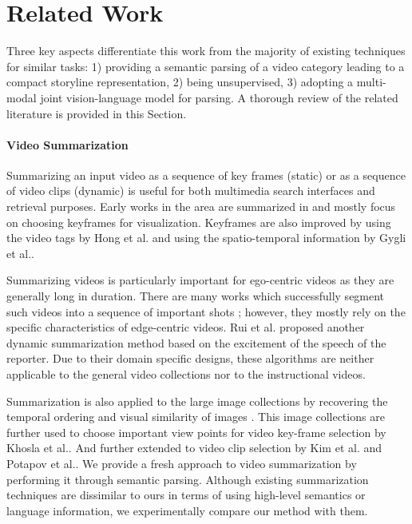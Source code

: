 \section{Related Work}
Three key aspects differentiate this work from the majority of existing techniques for similar tasks: 1) providing a semantic parsing of a video category leading to a compact storyline representation, 2) being unsupervised, 3) adopting a multi-modal joint vision-language model for parsing. A thorough review of the related literature is provided in this Section.

\paragraph{Video Summarization}
Summarizing an input video as a sequence of key frames (static) or as a sequence of video clips (dynamic) is useful for both multimedia search interfaces and retrieval purposes. Early works in the area are summarized in \cite{vidAbstraction} and mostly focus on choosing keyframes for visualization. Keyframes are also improved by using the video tags by Hong et al.\cite{beyondSearch} and using the spatio-temporal information by Gygli et al.\cite{createSum}.

Summarizing videos is particularly important for ego-centric videos as they are generally long in duration. There are many works which successfully segment such videos into a sequence of important shots \cite{lee2012discovering, lu2013story}; however, they mostly rely on the specific characteristics of edge-centric videos. Rui et al. \cite{rui2000automatically} proposed another dynamic summarization method based on the excitement of the speech of the reporter. Due to their domain specific designs, these algorithms are neither applicable to the general video collections nor to the instructional videos.

Summarization is also applied to the large image collections by recovering the temporal ordering and visual similarity of images \cite{storyGraph}. This image collections are further used to choose important view points for video key-frame selection by Khosla et al.\cite{khosla2013large}. And further extended to video clip selection by Kim et al.\cite{kim2014joint} and Potapov et al.\cite{potapov2014category}. We provide a fresh approach to video summarization by performing it through semantic parsing. Although existing summarization techniques are dissimilar to ours in terms of using high-level semantics or language information, we experimentally compare our method with them.

